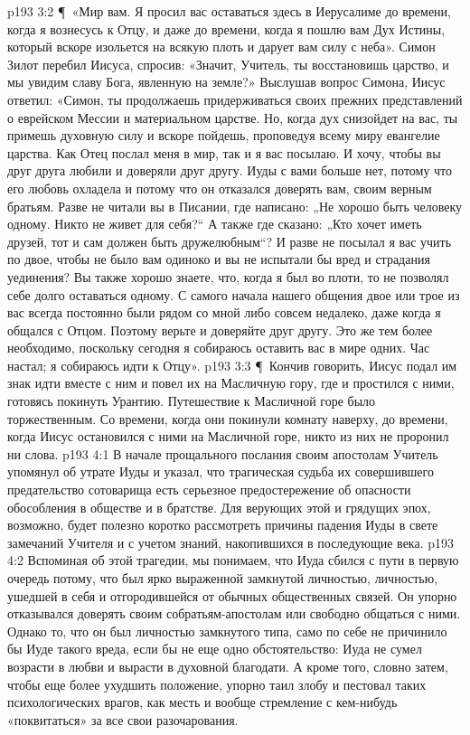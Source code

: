 \vs p193 3:2 \P\ «Мир вам. Я просил вас оставаться здесь в Иерусалиме до времени, когда я вознесусь к Отцу, и даже до времени, когда я пошлю вам Дух Истины, который вскоре изольется на всякую плоть и дарует вам силу с неба». Симон Зилот перебил Иисуса, спросив: «Значит, Учитель, ты восстановишь царство, и мы увидим славу Бога, явленную на земле?» Выслушав вопрос Симона, Иисус ответил: «Симон, ты продолжаешь придерживаться своих прежних представлений о еврейском Мессии и материальном царстве. Но, когда дух снизойдет на вас, ты примешь духовную силу и вскоре пойдешь, проповедуя всему миру евангелие царства. Как Отец послал меня в мир, так и я вас посылаю. И хочу, чтобы вы друг друга любили и доверяли друг другу. Иуды с вами больше нет, потому что его любовь охладела и потому что он отказался доверять вам, своим верным братьям. Разве не читали вы в Писании, где написано: „Не хорошо быть человеку одному. Никто не живет для себя?“ А также где сказано: „Кто хочет иметь друзей, тот и сам должен быть дружелюбным“? И разве не посылал я вас учить по двое, чтобы не было вам одиноко и вы не испытали бы вред и страдания уединения? Вы также хорошо знаете, что, когда я был во плоти, то не позволял себе долго оставаться одному. С самого начала нашего общения двое или трое из вас всегда постоянно были рядом со мной либо совсем недалеко, даже когда я общался с Отцом. Поэтому верьте и доверяйте друг другу. Это же тем более необходимо, поскольку сегодня я собираюсь оставить вас в мире одних. Час настал; я собираюсь идти к Отцу».
\vs p193 3:3 \P\ Кончив говорить, Иисус подал им знак идти вместе с ним и повел их на Масличную гору, где и простился с ними, готовясь покинуть Урантию. Путешествие к Масличной горе было торжественным. Со времени, когда они покинули комнату наверху, до времени, когда Иисус остановился с ними на Масличной горе, никто из них не проронил ни слова.
\vs p193 4:1 В начале прощального послания своим апостолам Учитель упомянул об утрате Иуды и указал, что трагическая судьба их совершившего предательство сотоварища есть серьезное предостережение об опасности обособления в обществе и в братстве. Для верующих этой и грядущих эпох, возможно, будет полезно коротко рассмотреть причины падения Иуды в свете замечаний Учителя и с учетом знаний, накопившихся в последующие века.
\vs p193 4:2 Вспоминая об этой трагедии, мы понимаем, что Иуда сбился с пути в первую очередь потому, что был ярко выраженной замкнутой личностью, личностью, ушедшей в себя и отгородившейся от обычных общественных связей. Он упорно отказывался доверять своим собратьям\hyp{}апостолам или свободно общаться с ними. Однако то, что он был личностью замкнутого типа, само по себе не причинило бы Иуде такого вреда, если бы не еще одно обстоятельство: Иуда не сумел возрасти в любви и вырасти в духовной благодати. А кроме того, словно затем, чтобы еще более ухудшить положение, упорно таил злобу и пестовал таких психологических врагов, как месть и вообще стремление с кем\hyp{}нибудь «поквитаться» за все свои разочарования.
